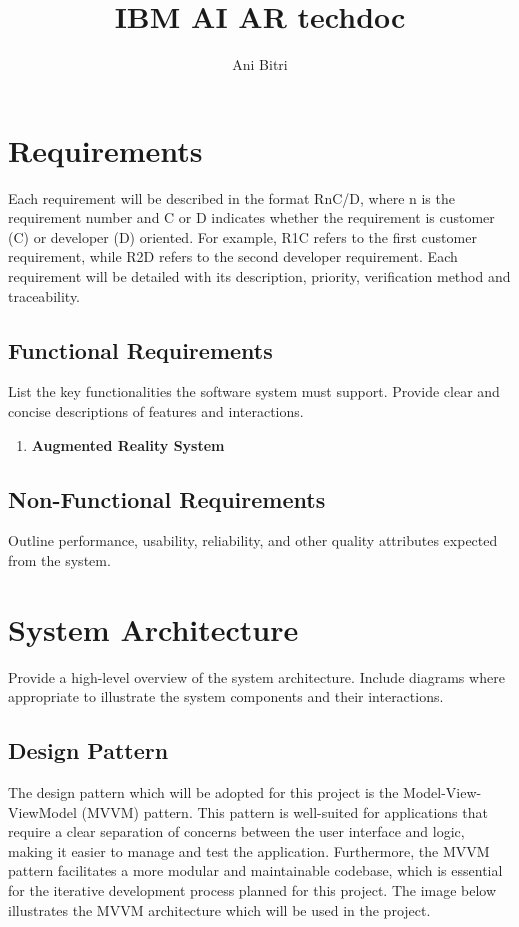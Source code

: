 \documentclass[12pt]{article}
\title{IBM AI AR techdoc}
\author{Ani Bitri}
\begin{document}

\maketitle
\tableofcontents
\newpage

\section{Requirements}
Each requirement will be described in the format R{n}C/D, where n is the requirement number and C or D indicates whether the requirement is customer (C) or developer (D) oriented. For example,
R1C refers to the first customer requirement, while R2D refers to the second developer requirement. Each requirement will be detailed with its description, priority, verification method and traceability.

    \subsection{Functional Requirements}
    List the key functionalities the software system must support. Provide clear and concise descriptions of features and interactions.

    \begin{enumerate}
        \item \textbf{Augmented Reality System}
    \end{enumerate}

    \subsection{Non-Functional Requirements}
    Outline performance, usability, reliability, and other quality attributes expected from the system.

\section{System Architecture}
Provide a high-level overview of the system architecture. Include diagrams where appropriate to illustrate the system components and their interactions.

    \subsection{Design Pattern}

    The design pattern which will be adopted for this project is the Model-View-ViewModel (MVVM) pattern. This pattern is well-suited for applications that require a clear separation
    of concerns between the user interface and logic, making it easier to manage and test the application. Furthermore, the MVVM pattern facilitates a more modular and maintainable
    codebase, which is essential for the iterative development process planned for this project. The image below illustrates the MVVM architecture which will be used in the project.
\end{document}
